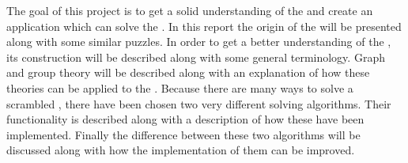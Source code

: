 The goal of this project is to get a solid understanding of the \rubik{} and create an application which can solve the \rubik{}.
In this report the origin of the \rubik{} will be presented along with some similar puzzles. 
In order to get a better understanding of the \rubik{}, its construction will be described along with some general terminology. 
Graph and group theory will be described along with an explanation of how these theories can be applied to the \rubik{}.
Because there are many ways to solve a scrambled \rubik{}, there have been chosen two very different solving algorithms.
Their functionality is described along with a description of how these have been implemented.
Finally the difference between these two algorithms will be discussed along with how the implementation of them can be improved.